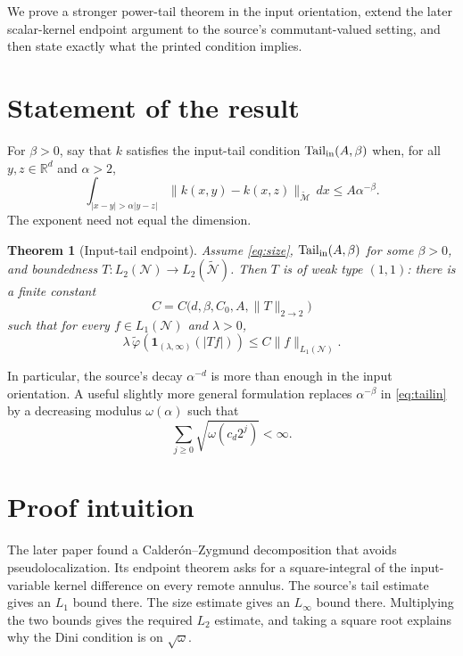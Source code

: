 \documentclass[11pt]{article}
\newtheorem{theorem}{Theorem}
\newcommand{\R}{\mathbb R}
\newcommand{\Mt}{\widetilde{\mathcal M}}
\newcommand{\N}{\mathcal N}
\newcommand{\Nt}{\widetilde{\mathcal N}}
\newcommand{\tvphi}{\widetilde{\varphi}}
\begin{document}
We prove a stronger power-tail theorem in the input orientation, extend the
later scalar-kernel endpoint argument to the source's commutant-valued
setting, and then state exactly what the printed condition implies.

\section{Statement of the result}

For $\beta>0$, say that $k$ satisfies the input-tail condition
$\mathrm{Tail}_{\rm in}(A,\beta)$ when, for all $y,z\in\R^d$ and $\alpha>2$,
\begin{equation}\label{eq:tailin}
 \int_{|x-y|>\alpha|y-z|}
 \|k(x,y)-k(x,z)\|_{\Mt}\,dx
 \le A\alpha^{-\beta}.
\end{equation}
The exponent need not equal the dimension.

\begin{theorem}[Input-tail endpoint]\label{thm:main}
Assume \eqref{eq:size}, $\mathrm{Tail}_{\rm in}(A,\beta)$ for some
$\beta>0$, and boundedness $T:L_2(\N)\to L_2(\Nt)$.  Then $T$ is of weak
type $(1,1)$: there is a finite constant
\[
 C=C\bigl(d,\beta,C_0,A,\|T\|_{2\to2}\bigr)
\]
such that for every $f\in L_1(\N)$ and $\lambda>0$,
\begin{equation}\label{eq:weak}
 \lambda\,\tvphi\!\left(
   \mathbf 1_{(\lambda,\infty)}(|Tf|)\right)
 \le C\|f\|_{L_1(\N)}.
\end{equation}
\end{theorem}

In particular, the source's decay $\alpha^{-d}$ is more than enough in the
input orientation.  A useful slightly more general formulation replaces
$\alpha^{-\beta}$ in \eqref{eq:tailin} by a decreasing modulus $\omega(\alpha)$
such that
\begin{equation}\label{eq:sqrtdini}
 \sum_{j\ge0}\sqrt{\omega(c_d2^j)}<\infty.
\end{equation}

\section{Proof intuition}

The later paper \cite{ccap} found a Calder\'on--Zygmund decomposition that
avoids pseudolocalization.  Its endpoint theorem asks for a square-integral
of the input-variable kernel difference on every remote annulus.  The source's
tail estimate gives an $L_1$ bound there.  The size estimate gives an
$L_\infty$ bound there.  Multiplying the two bounds gives the required
$L_2$ estimate, and taking a square root explains why the Dini condition is
on $\sqrt\omega$.
\end{document}
